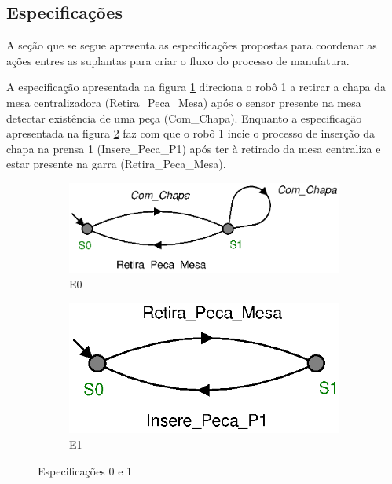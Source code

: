 \subsection{Especificações}
A seção que se segue apresenta as especificações propostas para coordenar as ações entres as suplantas para criar o fluxo do processo de manufatura.

A especificação apresentada na figura \ref{fig:e0} direciona o robô 1 a retirar a chapa da mesa centralizadora (Retira\_Peca\_Mesa) após o sensor presente na mesa detectar existência de uma peça (Com\_Chapa). Enquanto a especificação apresentada na figura \ref{fig:e1} faz com que o robô 1 incie o processo de inserção da chapa na prensa 1 (Insere\_Peca\_P1) após ter à retirado da mesa centraliza e estar presente na garra (Retira\_Peca\_Mesa).

\begin{figure}[H]%
  \centering
  \begin{subfigure}[b]{0.45\textwidth}
      \centering
      \includegraphics[width=\textwidth]{imagens/E0.eps}
      \caption{E0}
      \label{fig:e0}
  \end{subfigure}
  \hfill
  \begin{subfigure}[b]{0.45\textwidth}
      \centering
      \includegraphics[width=\textwidth]{imagens/E1.eps}
      \caption{E1}
      \label{fig:e1}
  \end{subfigure}
  \caption{Especificações 0 e 1}
  \label{fig:e01}
\end{figure}


